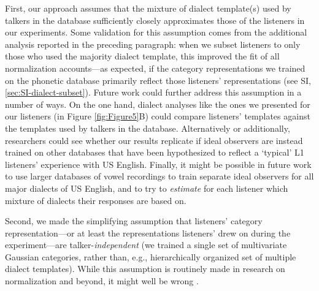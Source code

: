 \documentclass[preprint]{JASA}
\begin{document}
First, our approach assumes that the mixture of dialect template(s) used by talkers in the database sufficiently closely approximates those of the listeners in our experiments. Some validation for this assumption comes from the additional analysis reported in the preceding paragraph: when we subset listeners to only those who used the majority dialect template, this improved the fit of all normalization accounts---as expected, if the category representations we trained on the phonetic database primarily reflect those listeners' representations (see SI, \ref{sec:SI-dialect-subset}). Future work could further address this assumption in a number of ways. On the one hand, dialect analyses like the ones we presented for our listeners (in Figure \ref{fig:Figure5}B) could compare listeners' templates against the templates used by talkers in the database. Alternatively or additionally, researchers could see whether our results replicate if ideal observers are instead trained on other databases that have been hypothesized to reflect a `typical' L1 listeners' experience with US English. Finally, it might be possible in future work to use larger databases of vowel recordings to train separate ideal observers for all major dialects of US English, and to try to \emph{estimate} for each listener which mixture of dialects their responses are based on.

Second, we made the simplifying assumption that listeners' category representation---or at least the representations listeners' drew on during the experiment---are talker-\emph{independent} (we trained a single set of multivariate Gaussian categories, rather than, e.g., hierarchically organized set of multiple dialect templates). While this assumption is routinely made in research on normalization and beyond, it might well be wrong \citep[see e.g.,][]{xie2021}.
\end{document}
